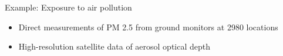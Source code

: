 \documentclass[t]{beamer}
\begin{document}
\begin{frame}{Example: Exposure to air pollution}

  \begin{itemize}
  \item Direct measurements of PM 2.5 from ground monitors at 2980
    locations
  \item High-resolution satellite data of aerosol optical depth
    
  \end{itemize}
  \begin{center}
\end{center}
\end{frame}
\end{document}
